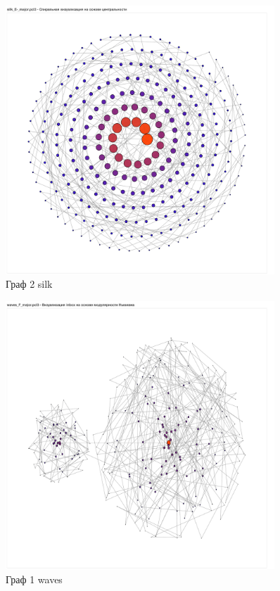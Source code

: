 \begin{figure}[H]
	\caption{Граф 2 silk}
	\includegraphics[width=0.9\textwidth]{img/silk2.pdf}
\end{figure}

\begin{figure}[H]
	\caption{Граф 1 waves}
	\includegraphics[width=0.9\textwidth]{img/waves1.pdf}
\end{figure}

